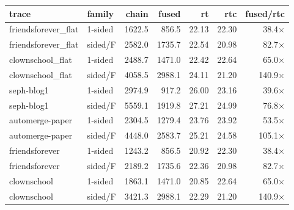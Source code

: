 \documentclass[11pt]{article}
\begin{document}
\begin{center}\small
\setlength{\tabcolsep}{5pt}
\begin{tabular}{@{}llrrrrr@{}}
\toprule
trace & family & chain & fused & rt & rtc & fused/rtc \\
\midrule
friendsforever\_flat & 1-sided & 1622.5 & 856.5 & 22.13 & 22.30 & 38.4$\times$ \\
friendsforever\_flat & sided/F & 2582.0 & 1735.7 & 22.54 & 20.98 & 82.7$\times$ \\
clownschool\_flat & 1-sided & 2488.7 & 1471.0 & 22.42 & 22.64 & 65.0$\times$ \\
clownschool\_flat & sided/F & 4058.5 & 2988.1 & 24.11 & 21.20 & 140.9$\times$ \\
seph-blog1 & 1-sided & 2974.9 & 917.2 & 26.00 & 23.16 & 39.6$\times$ \\
seph-blog1 & sided/F & 5559.1 & 1919.8 & 27.21 & 24.99 & 76.8$\times$ \\
automerge-paper & 1-sided & 2304.5 & 1279.4 & 23.76 & 23.92 & 53.5$\times$ \\
automerge-paper & sided/F & 4448.0 & 2583.7 & 25.21 & 24.58 & 105.1$\times$ \\
friendsforever & 1-sided & 1243.2 & 856.5 & 20.92 & 22.30 & 38.4$\times$ \\
friendsforever & sided/F & 2189.2 & 1735.6 & 22.36 & 20.98 & 82.7$\times$ \\
clownschool & 1-sided & 1863.1 & 1471.0 & 20.85 & 22.64 & 65.0$\times$ \\
clownschool & sided/F & 3421.3 & 2988.1 & 22.29 & 21.20 & 140.9$\times$ \\
\bottomrule
\end{tabular}
\end{center}
\end{document}
